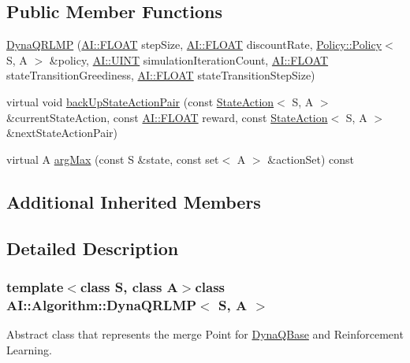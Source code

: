 \subsection*{Public Member Functions}
\begin{DoxyCompactItemize}
\item 
\hyperlink{classAI_1_1Algorithm_1_1DynaQRLMP_a79f36f74cf9de4649b07df5d46282598}{Dyna\+Q\+R\+L\+M\+P} (\hyperlink{namespaceAI_a41b74884a20833db653dded3918e05c3}{A\+I\+::\+F\+L\+O\+A\+T} step\+Size, \hyperlink{namespaceAI_a41b74884a20833db653dded3918e05c3}{A\+I\+::\+F\+L\+O\+A\+T} discount\+Rate, \hyperlink{classAI_1_1Algorithm_1_1Policy_1_1Policy}{Policy\+::\+Policy}$<$ S, A $>$ \&policy, \hyperlink{namespaceAI_ab6e14dc1e659854858a87e511f1439ec}{A\+I\+::\+U\+I\+N\+T} simulation\+Iteration\+Count, \hyperlink{namespaceAI_a41b74884a20833db653dded3918e05c3}{A\+I\+::\+F\+L\+O\+A\+T} state\+Transition\+Greediness, \hyperlink{namespaceAI_a41b74884a20833db653dded3918e05c3}{A\+I\+::\+F\+L\+O\+A\+T} state\+Transition\+Step\+Size)
\item 
virtual void \hyperlink{classAI_1_1Algorithm_1_1DynaQRLMP_a7b3b5f3706744290b12c19f786e5e4e4}{back\+Up\+State\+Action\+Pair} (const \hyperlink{classAI_1_1StateAction}{State\+Action}$<$ S, A $>$ \&current\+State\+Action, const \hyperlink{namespaceAI_a41b74884a20833db653dded3918e05c3}{A\+I\+::\+F\+L\+O\+A\+T} reward, const \hyperlink{classAI_1_1StateAction}{State\+Action}$<$ S, A $>$ \&next\+State\+Action\+Pair)
\item 
virtual A \hyperlink{classAI_1_1Algorithm_1_1DynaQRLMP_a57a8d01392c4a3699853f3aa623d9ebf}{arg\+Max} (const S \&state, const set$<$ A $>$ \&action\+Set) const 
\end{DoxyCompactItemize}
\subsection*{Additional Inherited Members}


\subsection{Detailed Description}
\subsubsection*{template$<$class S, class A$>$class A\+I\+::\+Algorithm\+::\+Dyna\+Q\+R\+L\+M\+P$<$ S, A $>$}

Abstract class that represents the merge Point for \hyperlink{classAI_1_1Algorithm_1_1DynaQBase}{Dyna\+Q\+Base} and Reinforcement Learning. 


